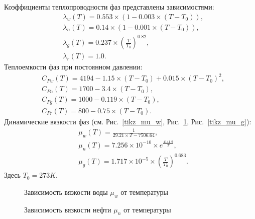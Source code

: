 Коэффициенты теплопроводности фаз представлены зависимостями:
\begin{equation}
  \begin{aligned}
    &\lambda_w(T)=0.553\times(1-0.003\times(T-T_0)),\\
    &\lambda_n(T)=0.14\times(1-0.001\times(T-T_0)),\\
    &\lambda_g(T)=0.237\times\left(\frac{T}{T_0}\right)^{0.82},\\
    &\lambda_r(T)=1.0.
  \end{aligned}
\end{equation}
Теплоемкости фаз при постоянном давлении:
\begin{equation}
  \begin{aligned}
    &C_{Pw}(T)= 4194 - 1.15 \times (T-T_0) + 0.015 \times (T-T_0)^2,\\
    &C_{Pn}(T)= 1700 - 3.4 \times (T-T_0),\\
    &C_{Pg}(T)= 1000 - 0.119 \times (T-T_0),\\
    &C_{Pr}(T)= 800 - 0.75 \times (T-T_0).
  \end{aligned}
\end{equation}
Динамические вязкости фаз (см. Рис.~\ref{tikz_mu_w}, Рис.~\ref{tikz_mu_n}, Рис.~\ref{tikz_mu_g}):
\begin{equation}
  \begin{aligned}
    &\mu_w(T)=\frac{1}{29.21 \times T - 7506.64},\\
    &\mu_n(T)=7.256\times10^{-10} \times e^{\frac{4141.9}{T}},\\
    &\mu_g(T)=1.717\times10^{-5} \times \left(\frac{T}{T_0}\right)^{0.683}.
  \end{aligned}
\end{equation}
Здесь $T_0=273K$.

\begin{figure}[h]
\begin{minipage}[h]{0.49\linewidth}
\caption{Зависимость вязкости воды $\mu_w$ от температуры}
\label{tikz_mu_w}
\end{minipage}
\hfill
\begin{minipage}[h]{0.49\linewidth}
\caption{Зависимость вязкости нефти $\mu_n$ от температуры}
\label{tikz_mu_n}
\end{minipage}
\end{figure}

